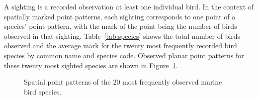 \documentclass{statsoc}
\begin{document}
A sighting is a recorded observation at least one individual bird. In the context of spatially marked point patterns, each sighting corresponds to one point of a species' point pattern, with the mark of the point being the number of birds observed in that sighting. Table~\ref{tab:species} shows the total number of birds observed and the average mark for the twenty most frequently recorded bird species by common name and species code.
Observed planar point patterns for these twenty most sighted species are shown in Figure~\ref{fig:birds20}.



 
\begin{figure}
\centering
{}
      \caption{\label{fig:birds20} Spatial point patterns of the $20$ most frequently observed marine bird species.}
\end{figure} 


\end{document}
